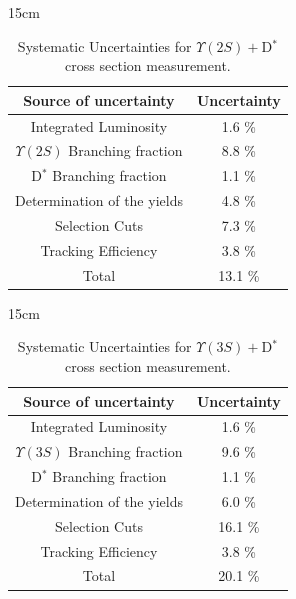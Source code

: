 \begin{table}[!htbp]{15cm}
  \caption{Systematic Uncertainties for $\Upsilon(2S) + $D$^{*}$ cross section measurement.}
  \begin{tabular}{ c | c }
    \hline
    Source of uncertainty             & Uncertainty \\ \hline
    Integrated Luminosity             & 1.6 \%      \\ \hline
    $\Upsilon(2S)$ Branching fraction & 8.8 \%      \\ \hline
    D$^*$ Branching fraction          & 1.1 \%      \\ \hline
    Determination of the yields       & 4.8 \%      \\ \hline
    Selection Cuts                    & 7.3 \%      \\ \hline
    Tracking Efficiency               & 3.8 \%      \\ \hline
    Total                             & 13.1 \%      \\ \hline
  \end{tabular}
  \label{tab:systematics2S}
\end{table}

\begin{table}[!htbp]{15cm}
  \caption{Systematic Uncertainties for $\Upsilon(3S) + $D$^{*}$ cross section measurement.}
  \begin{tabular}{ c | c }
    \hline
    Source of uncertainty             & Uncertainty \\ \hline
    Integrated Luminosity             & 1.6 \%      \\ \hline
    $\Upsilon(3S)$ Branching fraction & 9.6 \%      \\ \hline
    D$^*$ Branching fraction          & 1.1 \%      \\ \hline
    Determination of the yields       & 6.0 \%      \\ \hline
    Selection Cuts                    & 16.1 \%      \\ \hline
    Tracking Efficiency               & 3.8 \%      \\ \hline
    Total                             & 20.1 \%      \\ \hline
  \end{tabular}
  \label{tab:systematics3S}
\end{table}

